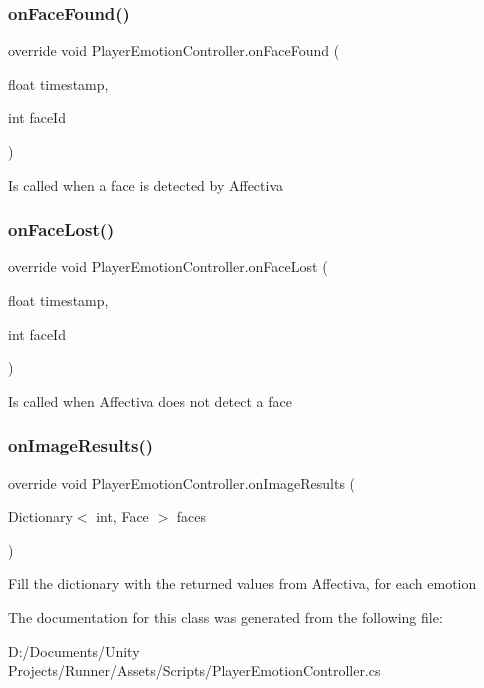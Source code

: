 \subsubsection{\texorpdfstring{on\+Face\+Found()}{onFaceFound()}}
{\footnotesize\ttfamily override void Player\+Emotion\+Controller.\+on\+Face\+Found (\begin{DoxyParamCaption}\item[{float}]{timestamp,  }\item[{int}]{face\+Id }\end{DoxyParamCaption})}

Is called when a face is detected by Affectiva \mbox{\label{class_player_emotion_controller_a27c247c8051c1026716b7f21a896ae61}} 
\subsubsection{\texorpdfstring{on\+Face\+Lost()}{onFaceLost()}}
{\footnotesize\ttfamily override void Player\+Emotion\+Controller.\+on\+Face\+Lost (\begin{DoxyParamCaption}\item[{float}]{timestamp,  }\item[{int}]{face\+Id }\end{DoxyParamCaption})}

Is called when Affectiva does not detect a face \mbox{\label{class_player_emotion_controller_a00e185773c0a3ce8a659bb78f4e9b952}} 
\subsubsection{\texorpdfstring{on\+Image\+Results()}{onImageResults()}}
{\footnotesize\ttfamily override void Player\+Emotion\+Controller.\+on\+Image\+Results (\begin{DoxyParamCaption}\item[{Dictionary$<$ int, Face $>$}]{faces }\end{DoxyParamCaption})}

Fill the dictionary with the returned values from Affectiva, for each emotion 

The documentation for this class was generated from the following file\+:\begin{DoxyCompactItemize}
\item 
D\+:/\+Documents/\+Unity Projects/\+Runner/\+Assets/\+Scripts/Player\+Emotion\+Controller.\+cs\end{DoxyCompactItemize}
